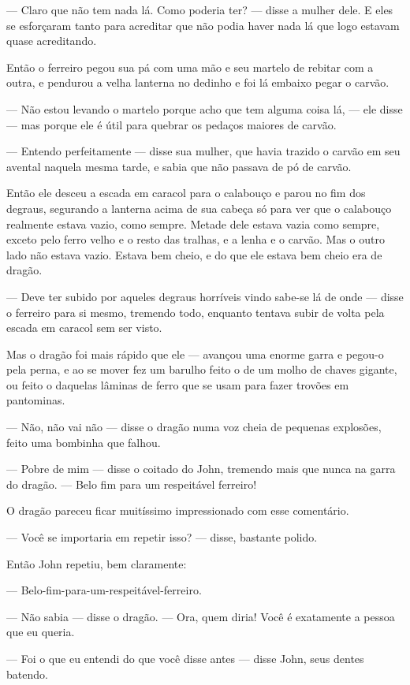 — Claro que não tem nada lá. Como poderia ter? — disse a mulher dele.
E eles se esforçaram tanto para acreditar que não podia haver nada lá
que logo estavam quase acreditando. 

Então o ferreiro pegou sua pá com uma mão e seu martelo de rebitar com
a outra, e pendurou a velha lanterna no dedinho e foi lá embaixo
pegar o carvão.

— Não estou levando o martelo porque acho que tem alguma coisa lá, —
ele disse — mas porque ele é útil para quebrar os pedaços maiores de
carvão.

— Entendo perfeitamente — disse sua mulher, que havia trazido o carvão
em seu avental naquela mesma tarde, e sabia que não passava de pó de
carvão.

Então ele desceu a escada em caracol para o calabouço e parou no fim
dos degraus, segurando a lanterna acima de sua cabeça só para ver que
o calabouço realmente estava vazio, como sempre. Metade dele estava
vazia como sempre, exceto pelo ferro velho e o resto das tralhas, e a
lenha e o carvão. Mas o outro lado não estava vazio. Estava bem
cheio, e do que ele estava bem cheio era de dragão. 

— Deve ter subido por aqueles degraus horríveis vindo sabe-se lá de
onde — disse o ferreiro para si mesmo, tremendo todo, enquanto
tentava subir de volta pela escada em caracol sem ser visto.

Mas o dragão foi mais rápido que ele — avançou uma enorme garra e
pegou-o pela perna, e ao se mover fez um barulho feito o de um molho
de chaves gigante, ou feito o daquelas lâminas de ferro que se usam
para fazer trovões em pantominas. 

— Não, não vai não — disse o dragão numa voz cheia de pequenas
explosões, feito uma bombinha que falhou.

— Pobre de mim — disse o coitado do John, tremendo mais que nunca na
garra do dragão. — Belo fim para um respeitável ferreiro!

O dragão pareceu ficar muitíssimo impressionado com esse comentário.

— Você se importaria em repetir isso? — disse, bastante polido.

Então John repetiu, bem claramente:

— Belo-fim-para-um-respeitável-ferreiro.

— Não sabia — disse o dragão. — Ora, quem diria! Você é exatamente a
pessoa que eu queria.

— Foi o que eu entendi do que você disse antes — disse John, seus
dentes batendo.

